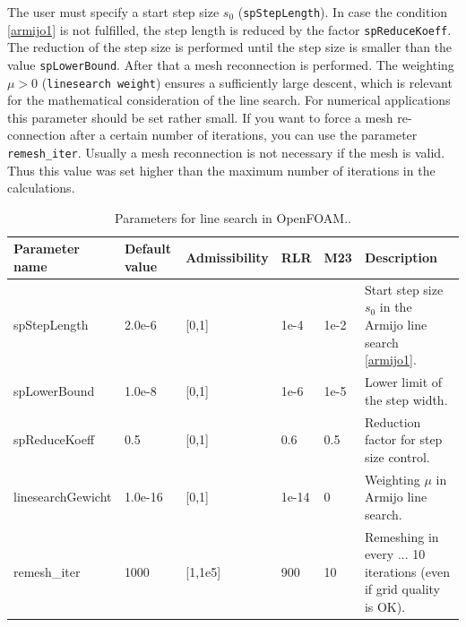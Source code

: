 \documentclass[oneside]{article}
\numberwithin{equation}{section}
\numberwithin{figure}{section}
\numberwithin{figure}{section}
\begin{document}
The user must specify a start step size $s_0$ (\texttt{spStepLength}). In case the condition \eqref{armijo1} is not fulfilled, the step length is reduced by the factor \texttt{spReduceKoeff}. The reduction of the step size is performed until the step size is smaller than the value \texttt{spLowerBound}. After that a mesh reconnection is performed. The weighting $\mu > 0$ (\texttt{linesearch weight}) ensures a sufficiently large descent, which is relevant for the mathematical consideration of the line search. For numerical applications this parameter should be set rather small. If you want to force a mesh re-connection after a certain number of iterations, you can use the parameter \verb|remesh_iter|. Usually a mesh reconnection is not necessary if the mesh is valid. Thus this value was set higher than the maximum number of iterations in the calculations.
\begin{table}[h]
    \centering
    \begin{tabular}{|p{2.4cm}|p{1.1cm}|p{0.8cm}|p{0.9cm}|p{0.9cm}|p{4cm}|} %
        \hline
        \cellcolor{light-gray} Parameter name & \cellcolor{light-gray} Default value & \cellcolor{light-gray} Admissibility & \cellcolor{light-gray} RLR & \cellcolor{light-gray} M23 & \cellcolor{light-gray} Description\\
        \hline
        spStepLength      &   2.0e-6 & [0,1]     & 1e-4 & 1e-2 & Start step size $s_0$ in the Armijo line search \ref{armijo1}. \\
        \hline
        spLowerBound      &   1.0e-8 & [0,1]     & 1e-6 & 1e-5 & Lower limit of the step width.\\
        \hline
        spReduceKoeff     &   0.5    & [0,1]     & 0.6  & 0.5 & Reduction factor for step size control.\\
        \hline
        linesearchGewicht &  1.0e-16 & [0,1]     & 1e-14 & 0  & Weighting $\mu$ in Armijo line search.\\
        \hline
        remesh\_iter      &   1000   & [1,1e5]   & 900   & 10 & Remeshing in every ... 10 iterations (even if grid quality is OK).\\
        \hline
    \end{tabular}
    \caption{Parameters for line search in OpenFOAM..}\label{tab:parameter4}
\end{table}
\end{document}
